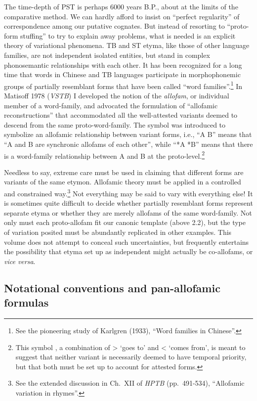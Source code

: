 The time-depth of PST is perhaps 6000 years B.P., about at the limits of the
comparative method. We can hardly afford to insist on “perfect regularity” of
correspondence among our putative cognates.  But instead of resorting to
“proto-form stuffing” to try to explain away problems, what is needed is an
explicit theory of variational phenomena.  TB and ST etyma, like those of other
language families, are not independent isolated entities, but stand in complex
phonosemantic relationships with each other.  It has been recognized for a long
time that words in Chinese and TB languages participate in morphophonemic groups
of partially resemblant forms that have been called “word families”.\footnote{See the pioneering study of Karlgren (1933), “Word families in Chinese”.}  In
Matisoff 1978 (\textit{VSTB}) I developed the notion of the \textit{allofam},
or individual member
of a word-family, and advocated the formulation of “allofamic reconstructions”
that accommodated all the well-attested variants deemed to descend from the same
proto-word-family.  The symbol  was introduced to symbolize an allofamic
relationship between variant forms, i.e., “A  B” means that “A and B are
synchronic allofams of each other”, while “*A  *B” means that there is a
word-family relationship between A and B at the proto-level.\footnote{This
symbol , a combination of  >  ‘goes to’ and < ‘comes from’, is meant to suggest
that neither variant is necessarily deemed to have temporal priority, but that
both must be set up to account for attested forms.}


Needless to say, extreme care must be used in claiming that different forms
are variants of the same etymon.  Allofamic theory must be applied in a
controlled and constrained way.\footnote{See the extended discussion in Ch.~XII
of \textit{HPTB} (pp.~491-534), “Allofamic variation in  rhymes”.} Not everything may be
said to vary with everything else! It is sometimes quite difficult to decide
whether partially resemblant forms represent separate etyma or whether they are
merely allofams of the same word-family.  Not only must each proto-allofam fit
our canonic template (above 2.2), but the type of variation posited must be
abundantly replicated in other examples.  This volume does not attempt to
conceal such uncertainties, but frequently entertains the possibility that etyma
set up as independent might actually be co-allofams, or \textit{vice versa}. 

\subsection{Notational conventions and pan-allofamic formulas}

